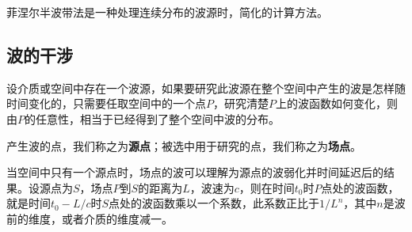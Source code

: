 



菲涅尔半波带法是一种处理连续分布的波源时，简化的计算方法。



\subsection{波的干涉}


设介质或空间中存在一个波源，如果要研究此波源在整个空间中产生的波是怎样随时间变化的，只需要任取空间中的一个点$P$，研究清楚$P$上的波函数如何变化，则由$P$的任意性，相当于已经得到了整个空间中波的分布。

产生波的点，我们称之为\textbf{源点}；被选中用于研究的点，我们称之为\textbf{场点}。

当空间中只有一个源点时，场点的波可以理解为源点的波弱化并时间延迟后的结果。设源点为$S$，场点$P$到$S$的距离为$L$，波速为$c$，则在时间$t_0$时$P$点处的波函数，就是时间$t_0-L/c$时$S$点处的波函数乘以一个系数，此系数正比于$1/L^{n}$，其中$n$是波前的维度，或者介质的维度减一。
























